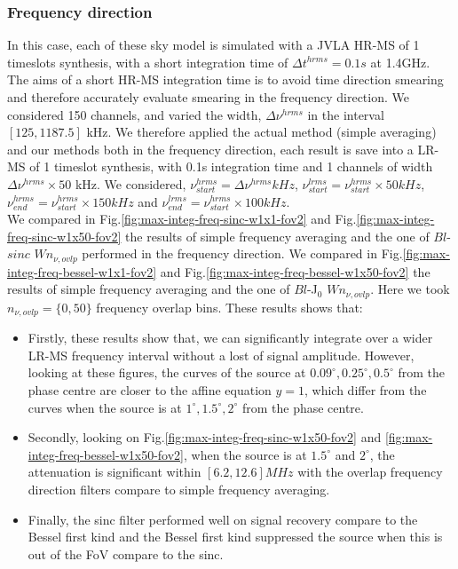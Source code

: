 \documentclass[useAMS,usenatbib]{mn2e}
\begin{document}
\subsubsection{Frequency direction}
In this case, each of these sky model is simulated with a JVLA HR-MS of 1 timeslots synthesis, with a short integration time of $\Delta 
t^{hrms}=0.1s$ at 1.4GHz. The aims of a short HR-MS integration time is to avoid time direction smearing and therefore accurately evaluate
smearing in the frequency direction. We considered 150 channels, and varied the width, $\Delta \nu^{hrms}$ in the interval $[125,1187.5]$ 
kHz.   We therefore applied the actual method 
(simple averaging) and our methods both in the frequency direction, each result is save into a LR-MS of 1 timeslot synthesis, with 0.1s 
integration time and 1 channels of width $\Delta \nu^{hrms}\times50$ kHz. We considered, $\nu^{hrms}_{start}=\Delta \nu^{hrms}kHz$, 
$\nu^{lrms}_{start}=\nu^{hrms}_{start}\times50 kHz$, $\nu^{hrms}_{end}=\nu^{hrms}_{start}\times150 kHz$ and 
$\nu^{lrms}_{end}=\nu^{hrms}_{start}\times100 kHz$.\\
We compared in Fig.\ref{fig:max-integ-freq-sinc-w1x1-fov2} and Fig.\ref{fig:max-integ-freq-sinc-w1x50-fov2}  the results of simple 
frequency averaging and the one of  $Bl$-$sinc$ $W n_{\nu,ovlp}$ performed in the frequency direction. We compared in 
Fig.\ref{fig:max-integ-freq-bessel-w1x1-fov2} and Fig.\ref{fig:max-integ-freq-bessel-w1x50-fov2} the results of simple 
frequency averaging and the one of  $Bl$-J$_0$ $W n_{\nu,ovlp}$. Here we took $n_{\nu,ovlp}=\{0,50\}$ frequency overlap bins. These results 
shows that:
\begin{itemize}
 \item Firstly, these results show that, we can significantly integrate over a wider LR-MS frequency interval without a lost of signal 
amplitude. However, looking at these figures, the curves of the source at $0.09^{\circ},0.25^{\circ},0.5^{\circ}$ from the phase centre are 
closer to the affine equation $y=1$, which differ from the curves when the source is at $1^{\circ},1.5^{\circ}, 2^{\circ}$ from the phase 
centre.  
 \item Secondly, looking on Fig.\ref{fig:max-integ-freq-sinc-w1x50-fov2} and 
\ref{fig:max-integ-freq-bessel-w1x50-fov2}, when the source is at $1.5^{\circ}$ and $2^{\circ}$, the attenuation is significant within 
$[6.2,12.6]MHz$ with the overlap frequency direction filters compare to simple frequency averaging.
 \item Finally, the sinc filter performed well on signal recovery compare to the Bessel first kind and the Bessel first kind suppressed the 
source when this is out of the FoV compare to the sinc.  
\end{itemize}
\end{document}
